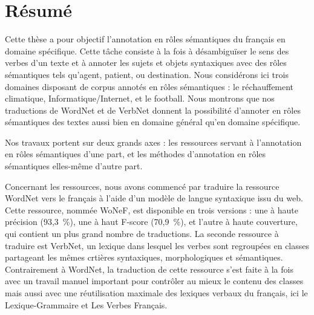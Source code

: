 \documentclass[oneside,parskip,draft]{scrbook}
\date{\Large
    \begin{minipage}[t]{0.61\linewidth}
    \begin{center}\textbf{Thèse sous la direction de :}\end{center}
    Laurence \textsc{Danlos} et Gaël \textsc{de Chalendar}
    \begin{center}~\end{center}
    \begin{center}~\end{center}
    \end{minipage}
}
\title{}
\begin{document}
\maketitle

\frontmatter



\chapter{Résumé}


Cette thèse a pour objectif l'annotation en rôles sémantiques du français en
domaine spécifique. Cette tâche consiste à la fois à désambiguïser le sens des
verbes d'un texte et à annoter les sujets et objets syntaxiques avec des rôles
sémantiques tels qu'agent, patient, ou destination. Nous considérons ici trois
domaines disposant de corpus annotés en rôles sémantiques : le réchauffement
climatique, Informatique/Internet, et le football. Nous montrons que nos
traductions de WordNet et de VerbNet donnent la possibilité d'annoter en rôles
sémantiques des textes aussi bien en domaine général qu'en domaine spécifique.

Nos travaux portent sur deux grands axes : les ressources servant à
l'annotation en rôles sémantiques d'une part, et les méthodes d'annotation en
rôles sémantiques elles-même d'autre part.

Concernant les ressources, nous avons commencé par traduire la ressource
WordNet vers le français à l'aide d'un modèle de langue syntaxique issu du web.
Cette ressource, nommée WoNeF, est disponible en trois versions : une à haute
précision (93,3~\%), une à haut F-score (70,9~\%), et l'autre à haute
couverture, qui contient un plus grand nombre de traductions. La seconde
ressource à traduire est VerbNet, un lexique dans lesquel les verbes sont
regroupées en classes partageant les mêmes crtières syntaxiques, morphologiques
et sémantiques. Contrairement à WordNet, la traduction de cette ressource s'est
faite à la fois avec un travail manuel important pour contrôler au mieux le
contenu des classes mais aussi avec une réutilisation maximale des lexiques
verbaux du français, ici le Lexique-Grammaire et Les Verbes Français.
\end{document}
